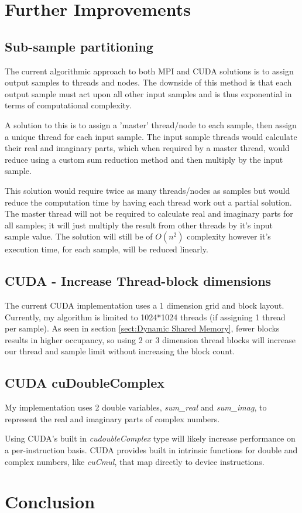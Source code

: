 \documentclass[11pt,a4paper]{article}
\begin{document}
\section{Further Improvements}
\subsection{Sub-sample partitioning}
The current algorithmic approach to both MPI and CUDA solutions is to assign output samples to threads and nodes. The downside of this method is that each output sample must act upon all other input samples and is thus exponential in terms of computational complexity.

A solution to this is to assign a 'master' thread/node to each sample, then assign a unique thread for each input sample. The input sample threads would calculate their real and imaginary parts, which when required by a master thread, would reduce using a custom sum reduction method and then multiply by the input sample.

This solution would require twice as many threads/nodes as samples but would reduce the computation time by having each thread work out a partial solution. The master thread will not be required to calculate real and imaginary parts for all samples; it will just multiply the result from other threads by it's input sample value. The solution will still be of $O(n^2)$ complexity however it's execution time, for each sample, will be reduced linearly.

\subsection{CUDA - Increase Thread-block dimensions}
The current CUDA implementation uses a 1 dimension grid and block layout. Currently, my algorithm is limited to 1024*1024 threads (if assigning 1 thread per sample). As seen in section \ref{sect:Dynamic Shared Memory}, fewer blocks results in higher occupancy, so using 2 or 3 dimension thread blocks will increase our thread and sample limit without increasing the block count. 

\subsection{CUDA cuDoubleComplex}
My implementation uses 2 double variables, \textit{sum\_real} and \textit{sum\_imag}, to represent the real and imaginary parts of complex numbers.

Using CUDA's built in \textit{cudoubleComplex} type will likely increase performance on a per-instruction basis. CUDA provides built in intrinsic functions for double and complex numbers, like \textit{cuCmul}, that map directly to device instructions.

\newpage
\section{Conclusion}
\end{document}
